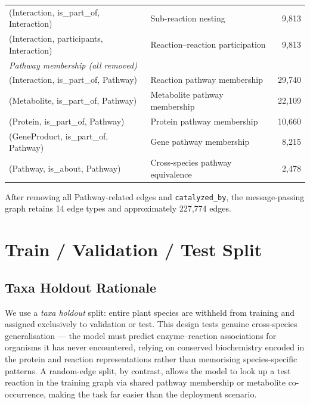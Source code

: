 \begin{table}[h]
\begin{tabular}{llr}
(Interaction, is\_part\_of, Interaction)           & Sub-reaction nesting                          & 9,813 \\
(Interaction, participants, Interaction)           & Reaction–reaction participation               & 9,813 \\
\midrule
\multicolumn{3}{l}{\textit{Pathway membership (\emph{all removed})}} \\
(Interaction, is\_part\_of, Pathway)               & Reaction pathway membership                   & 29,740 \\
(Metabolite, is\_part\_of, Pathway)                & Metabolite pathway membership                 & 22,109 \\
(Protein, is\_part\_of, Pathway)                   & Protein pathway membership                    & 10,660 \\
(GeneProduct, is\_part\_of, Pathway)               & Gene pathway membership                       & 8,215 \\
(Pathway, is\_about, Pathway)                      & Cross-species pathway equivalence             & 2,478 \\
\bottomrule
\end{tabular}
\end{table}

\noindent
After removing all Pathway-related edges and \texttt{catalyzed\_by},
the message-passing graph retains 14 edge types and approximately
227,774 edges.


\section{Train / Validation / Test Split}
\label{app:split}

\subsection{Taxa Holdout Rationale}

We use a \emph{taxa holdout} split: entire plant species are withheld from
training and assigned exclusively to validation or test.
This design tests genuine cross-species generalisation — the model must predict
enzyme–reaction associations for organisms it has never encountered, relying on
conserved biochemistry encoded in the protein and reaction representations rather
than memorising species-specific patterns.
A random-edge split, by contrast, allows the model to look up a test reaction
in the training graph via shared pathway membership or metabolite co-occurrence,
making the task far easier than the deployment scenario.


